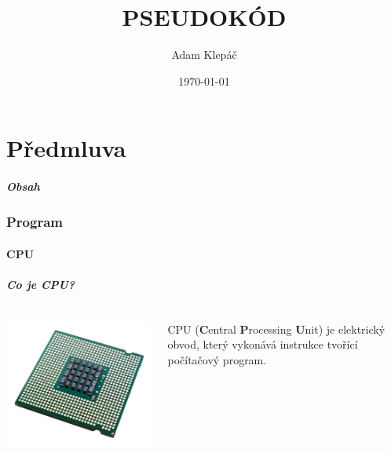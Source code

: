 \documentclass[aspectratio=169,11pt]{beamer}
\title{PSEUDOKÓD}
\date{\today}
\author{Adam Klepáč}
\institute[GEVO]{Gymnázium Evolution Jižní Město}
\begin{document}
\maketitle

\part[Předmluva]{Předmluva}

\begin{frame}
 \partpage
\end{frame}

\begin{frame}
 \frametitle{Obsah}
 \tableofcontents
\end{frame}

\section[Program]{Program}
\subsection[CPU]{CPU}

\begin{frame}
 \frametitle{Co je CPU?}
 \begin{columns}
  \begin{column}{.3\textwidth}
   \includegraphics[width=\textwidth]{cpu}
  \end{column}
  \begin{column}{.7\textwidth}
   \begin{tcolorbox}
    CPU (\textbf{C}entral \textbf{P}rocessing \textbf{U}nit) je elektrický
    obvod, který vykonává \alert{instrukce} tvořící \alert{počítačový program}.
   \end{tcolorbox}
  \end{column}
 \end{columns}
\end{frame}
\end{document}
